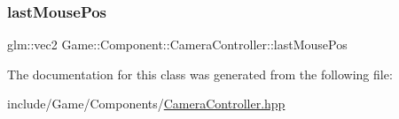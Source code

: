 \mbox{\label{class_game_1_1_component_1_1_camera_controller_ab87262dadb4c07a9777393d85ad0ed28}} 
\subsubsection{\texorpdfstring{last\+Mouse\+Pos}{lastMousePos}}
{\footnotesize\ttfamily glm\+::vec2 Game\+::\+Component\+::\+Camera\+Controller\+::last\+Mouse\+Pos}



The documentation for this class was generated from the following file\+:\begin{DoxyCompactItemize}
\item 
include/\+Game/\+Components/\mbox{\hyperlink{_camera_controller_8hpp}{Camera\+Controller.\+hpp}}\end{DoxyCompactItemize}
